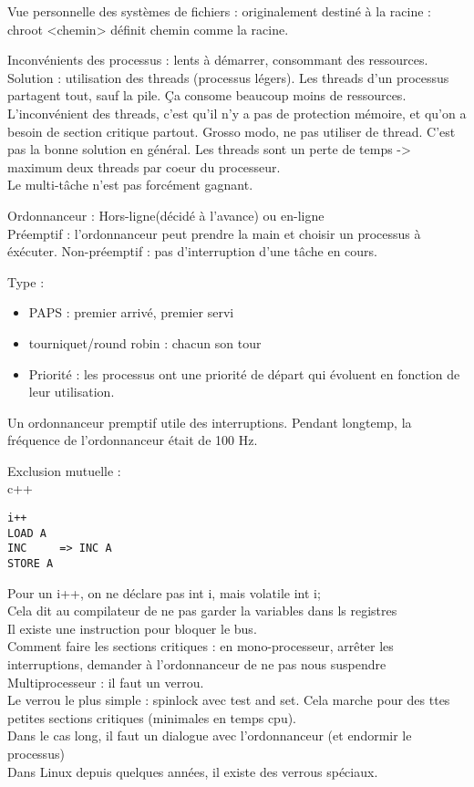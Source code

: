 \documentclass{article}
\begin{document}
Vue personnelle des systèmes de fichiers : originalement destiné à la racine  : chroot <chemin> définit chemin comme la racine.

Inconvénients des processus : lents à démarrer, consommant des ressources. Solution : utilisation des threads (processus légers). Les threads d'un processus partagent tout, sauf la pile. Ça consome beaucoup moins de ressources. L'inconvénient des threads, c'est qu'il n'y a pas de protection mémoire, et qu'on a besoin de section critique partout. Grosso modo, ne pas utiliser de thread. C'est pas la bonne solution en général. Les threads sont un perte de temps -> maximum deux threads par coeur du processeur.\\

Le multi-tâche n'est pas forcément gagnant.

Ordonnanceur : Hors-ligne(décidé à l'avance)  ou en-ligne\\ Préemptif : l'ordonnanceur peut prendre la main et choisir un processus à éxécuter. Non-préemptif : pas d'interruption d'une tâche en cours.

Type : 
\begin{itemize}
	\item PAPS : premier arrivé, premier servi
	\item tourniquet/round robin : chacun son tour
	\item Priorité : les processus ont une priorité de départ qui évoluent en fonction de leur utilisation.
\end{itemize}

Un ordonnanceur premptif utile des interruptions. Pendant longtemp, la fréquence de l'ordonnanceur était de 100 Hz.

Exclusion mutuelle : \\
c++ \\
\begin{verbatim}
i++
LOAD A
INC 	=> INC A
STORE A
\end{verbatim}

Pour un i++, on ne déclare pas int i, mais volatile int i;\\
Cela dit au compilateur de ne pas garder la variables dans ls registres\\
Il existe une instruction pour bloquer le bus.\\

Comment faire les sections critiques : en mono-processeur, arrêter les interruptions, demander à l'ordonnanceur de ne pas nous suspendre\\
Multiprocesseur : il faut un verrou.\\Le verrou le plus simple : spinlock avec test and set. Cela marche pour des ttes petites sections critiques (minimales en temps cpu).\\Dans le cas long, il faut un dialogue avec l'ordonnanceur (et endormir le processus)\\
Dans Linux depuis quelques années, il existe des verrous spéciaux.
\end{document}
